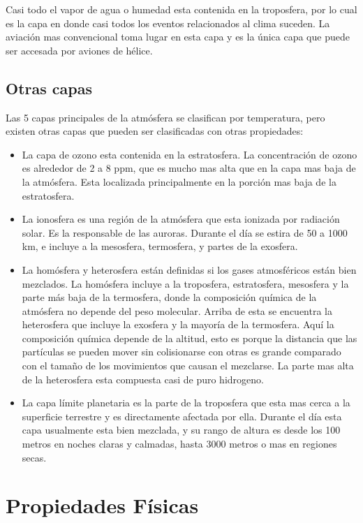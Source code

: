 \documentclass{article} %
\begin{document}
Casi todo el vapor de agua o humedad esta contenida en la troposfera, por lo cual es la capa en donde casi todos los eventos relacionados al clima suceden. La aviación mas convencional toma lugar en esta capa y es la única capa que puede ser accesada por aviones de hélice. 

\subsection{Otras capas}
Las 5 capas principales de la atmósfera se clasifican por temperatura, pero existen otras capas que pueden ser clasificadas con otras propiedades: 
\begin{itemize}
    \item La capa de ozono esta contenida en la estratosfera. La concentración de ozono es alrededor de 2 a 8 ppm, que es mucho mas alta que en la capa mas baja de la atmósfera. Esta localizada principalmente en la porción mas baja de la estratosfera.
    \item La ionosfera es una región de la atmósfera que esta ionizada por radiación solar. Es la responsable de las auroras. Durante el día se estira de 50 a 1000 km, e incluye a la mesosfera, termosfera, y partes de la exosfera. 
    \item La homósfera y heterosfera están definidas si los gases atmosféricos están bien mezclados. La homósfera incluye a la troposfera, estratosfera, mesosfera y la parte más baja de la termosfera, donde la composición química de la atmósfera no depende del peso molecular. Arriba de esta se encuentra la heterosfera que incluye la exosfera y la mayoría de la termosfera. Aquí la composición química depende de la altitud, esto es porque la distancia que las partículas se pueden mover sin colisionarse con otras es grande comparado con el tamaño de los movimientos que causan el mezclarse. La parte mas alta de la heterosfera esta compuesta casi de puro hidrogeno.
    \item La capa límite planetaria es la parte de la troposfera que esta mas cerca a la superficie terrestre y es directamente afectada por ella. Durante el día esta capa usualmente esta bien mezclada, y su rango de altura es desde los 100 metros en noches claras y calmadas, hasta 3000 metros o mas en regiones secas.
\end{itemize}

\section{Propiedades Físicas}
\end{document}
